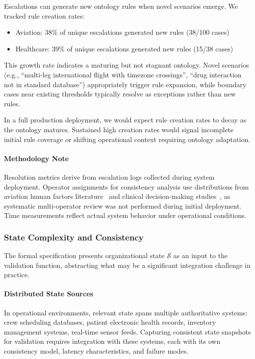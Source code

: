 \documentclass[sigconf,nonacm]{acmart}
\begin{document}
Escalations can generate new ontology rules when novel scenarios emerge.
We tracked rule creation rates:

\begin{itemize}
\item Aviation: 38\% of unique escalations generated new rules (38/100 cases)
\item Healthcare: 39\% of unique escalations generated new rules (15/38 cases)
\end{itemize}

This growth rate indicates a maturing but not stagnant ontology. Novel scenarios
(e.g., ``multi-leg international flight with timezone crossings'', ``drug
interaction not in standard database'') appropriately trigger rule expansion,
while boundary cases near existing thresholds typically resolve as exceptions
rather than new rules.

In a full production deployment, we would expect rule creation rates to decay as the ontology
matures. Sustained high creation rates would signal incomplete initial rule
coverage or shifting operational context requiring ontology adaptation.

\paragraph{Methodology Note}
Resolution metrics derive from escalation logs collected during system deployment.
Operator assignments for consistency analysis use distributions from aviation
human factors literature~\cite{faa-human-factors} and clinical decision-making
studies~\cite{kahneman2009conditions}, as systematic multi-operator review was not
performed during initial deployment. Time measurements reflect actual system
behavior under operational conditions.


\subsubsection{State Complexity and Consistency}
\label{sec:state-complexity}

The formal specification presents organizational state $\mathcal{S}$ as an input to the validation function, abstracting what may be a significant integration challenge in practice.

\paragraph{Distributed State Sources} In operational environments, relevant state spans multiple authoritative systems: crew scheduling databases, patient electronic health records, inventory management systems, real-time sensor feeds. Capturing consistent state snapshots for validation requires integration with these systems, each with its own consistency model, latency characteristics, and failure modes.
\end{document}
